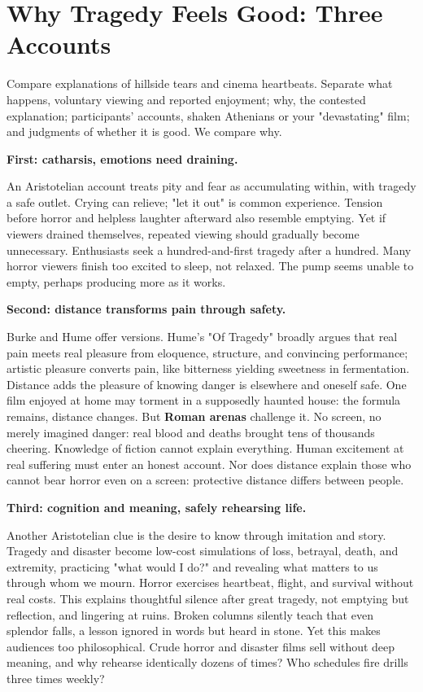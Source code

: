 \section{Why Tragedy Feels Good: Three Accounts}
Compare explanations of hillside tears and cinema heartbeats. Separate what happens, voluntary viewing and reported enjoyment; why, the contested explanation; participants' accounts, shaken Athenians or your "devastating" film; and judgments of whether it is good. We compare why.

\textbf{First: catharsis, emotions need draining.}

An Aristotelian account treats pity and fear as accumulating within, with tragedy a safe outlet. Crying can relieve; "let it out" is common experience. Tension before horror and helpless laughter afterward also resemble emptying. Yet if viewers drained themselves, repeated viewing should gradually become unnecessary. Enthusiasts seek a hundred-and-first tragedy after a hundred. Many horror viewers finish too excited to sleep, not relaxed. The pump seems unable to empty, perhaps producing more as it works.

\textbf{Second: distance transforms pain through safety.}

Burke and Hume offer versions. Hume's "Of Tragedy" broadly argues that real pain meets real pleasure from eloquence, structure, and convincing performance; artistic pleasure converts pain, like bitterness yielding sweetness in fermentation. Distance adds the pleasure of knowing danger is elsewhere and oneself safe. One film enjoyed at home may torment in a supposedly haunted house: the formula remains, distance changes. But \textbf{Roman arenas} challenge it. No screen, no merely imagined danger: real blood and deaths brought tens of thousands cheering. Knowledge of fiction cannot explain everything. Human excitement at real suffering must enter an honest account. Nor does distance explain those who cannot bear horror even on a screen: protective distance differs between people.

\textbf{Third: cognition and meaning, safely rehearsing life.}

Another Aristotelian clue is the desire to know through imitation and story. Tragedy and disaster become low-cost simulations of loss, betrayal, death, and extremity, practicing "what would I do?" and revealing what matters to us through whom we mourn. Horror exercises heartbeat, flight, and survival without real costs. This explains thoughtful silence after great tragedy, not emptying but reflection, and lingering at ruins. Broken columns silently teach that even splendor falls, a lesson ignored in words but heard in stone. Yet this makes audiences too philosophical. Crude horror and disaster films sell without deep meaning, and why rehearse identically dozens of times? Who schedules fire drills three times weekly?

